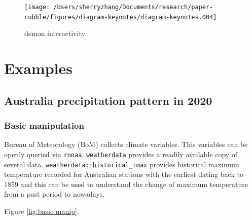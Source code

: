 \documentclass[
]{jss}
\begin{document}
\begin{CodeChunk}
\begin{figure}

{\centering \texttt{[image: /Users/sherryzhang/Documents/research/paper-cubble/figures/diagram-keynotes/diagram-keynotes.004]} 

}

\caption[demon interactivity]{demon interactivity}\label{fig:illu-interactive}
\end{figure}
\end{CodeChunk}

\newpage

\hypertarget{examples}{%
\section{Examples}\label{examples}}

\hypertarget{australia-precipitation-pattern-in-2020}{%
\subsection{Australia precipitation pattern in
2020}\label{australia-precipitation-pattern-in-2020}}

\hypertarget{basic-manipulation}{%
\subsubsection{Basic manipulation}\label{basic-manipulation}}

Bureau of Meteorology (BoM) collects climate variables. This variables
can be openly queried via \texttt{rnoaa}. \texttt{weatherdata} provides
a readily available copy of several data.
\texttt{weatherdata::historical\_tmax} provides historical maximum
temperature recorded for Australian stations with the earliest dating
back to 1859 and this can be used to understand the change of maximum
temperature from a past period to nowadays.

Figure \ref{fig:basic-manip}.
\end{document}
